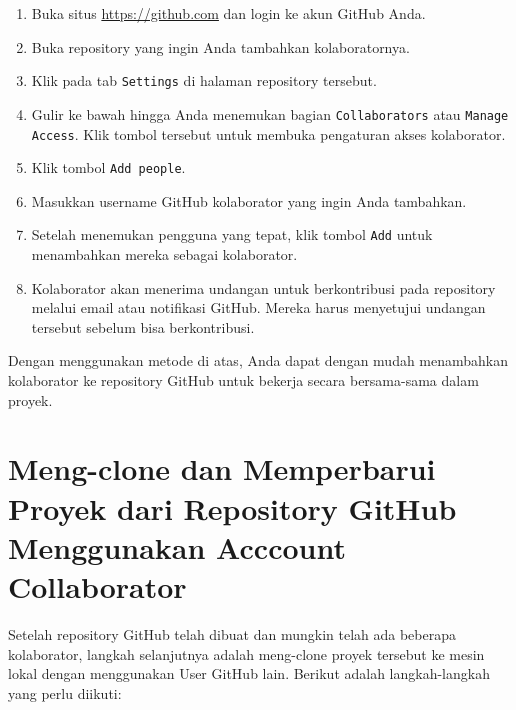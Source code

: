 \begin{enumerate}
	\item Buka situs \url{https://github.com} dan login ke akun GitHub Anda.
	
	\item Buka repository yang ingin Anda tambahkan kolaboratornya.
	
	\item Klik pada tab \texttt{Settings} di halaman repository tersebut.
	
	\item Gulir ke bawah hingga Anda menemukan bagian \texttt{Collaborators} atau \texttt{Manage Access}. Klik tombol tersebut untuk membuka pengaturan akses kolaborator.
	
	\item Klik tombol \texttt{Add people}.
	
	\item Masukkan username GitHub kolaborator yang ingin Anda tambahkan.
	
	\item Setelah menemukan pengguna yang tepat, klik tombol \texttt{Add} untuk menambahkan mereka sebagai kolaborator.
	
	\item Kolaborator akan menerima undangan untuk berkontribusi pada repository melalui email atau notifikasi GitHub. Mereka harus menyetujui undangan tersebut sebelum bisa berkontribusi.
\end{enumerate}

Dengan menggunakan metode di atas, Anda dapat dengan mudah menambahkan kolaborator ke repository GitHub untuk bekerja secara bersama-sama dalam proyek.


\section{Meng-clone dan Memperbarui Proyek dari Repository GitHub Menggunakan Acccount Collaborator}

Setelah repository GitHub telah dibuat dan mungkin telah ada beberapa kolaborator, langkah selanjutnya adalah meng-clone proyek tersebut ke mesin lokal dengan menggunakan User GitHub lain. Berikut adalah langkah-langkah yang perlu diikuti:

